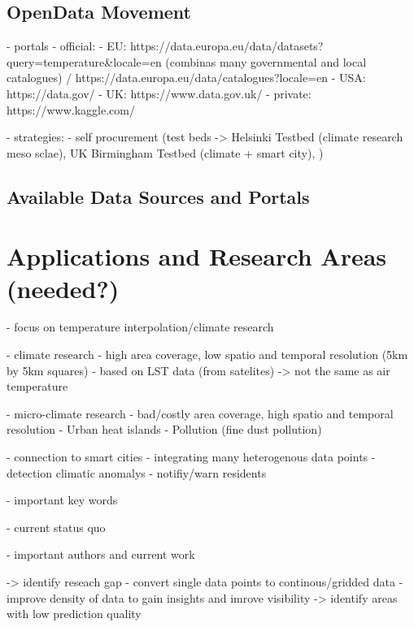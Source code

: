 \subsection{OpenData Movement}
 - portals
        - official:
            - EU: https://data.europa.eu/data/datasets?query=temperature\&locale=en (combinas many governmental and local catalogues) / https://data.europa.eu/data/catalogues?locale=en
            - USA: https://data.gov/
            - UK: https://www.data.gov.uk/
        - private: https://www.kaggle.com/

- strategies:
    - self procurement (test beds -> Helsinki Testbed (climate research meso sclae), UK Birmingham Testbed (climate + smart city), )

\subsection{Available Data Sources and Portals}

\section{Applications and Research Areas (needed?)}

- focus on temperature interpolation/climate research

- climate research
    - high area coverage, low spatio and temporal resolution (5km by 5km squares)
    - based on LST data (from satelites) -> not the same as air temperature

- micro-climate research
    - bad/costly area coverage, high spatio and temporal resolution
    - Urban heat islands
    - Pollution (fine dust pollution)

- connection to smart cities
    - integrating many heterogenous data points
    - detection climatic anomalys
    - notifiy/warn residents

- important key words

- current status quo

- important authors and current work

-> identify reseach gap
- convert single data points to continous/gridded data
- improve density of data to gain insights and imrove visibility -> identify areas with low prediction quality
